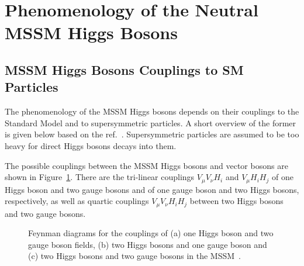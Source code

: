 \section{Phenomenology of the Neutral MSSM Higgs Bosons}\label{sec:pheno}

\subsection{MSSM Higgs Bosons Couplings to SM Particles}\label{sec:couplings}
The phenomenology of the MSSM Higgs bosons depends on their couplings to the Standard Model and to supersymmetric particles. 
A short overview of the former is given below based on the ref.~\cite{Djuadi}. Supersymmetric particles are assumed
to be too heavy for direct Higgs bosons decays into them.

The possible couplings between the MSSM Higgs bosons and vector bosons are shown in Figure~\ref{fig:couplings}. There are 
the tri-linear couplings $V_{\mu}V_{\nu}H_i$ and  $V_{\mu}H_{i}H_j$ of one  Higgs boson  and two gauge bosons and of one gauge boson and
 two Higgs bosons, respectively, as well as  quartic couplings  $V_{\mu}V_{\nu}H_iH_j$ between two Higgs bosons and two gauge bosons.
\begin{figure}[tp]
     \begin{center}
     	\hspace{0.5cm}
     	\hspace{0.5cm}
     \end{center}
    \caption{Feynman diagrams for the couplings of (a) one Higgs boson and two gauge boson fields, (b) two Higgs bosons and one gauge boson 
		and (c) two Higgs bosons and two gauge bosons in the MSSM~\cite{Djuadi}. }
   \label{fig:couplings}
\end{figure}
